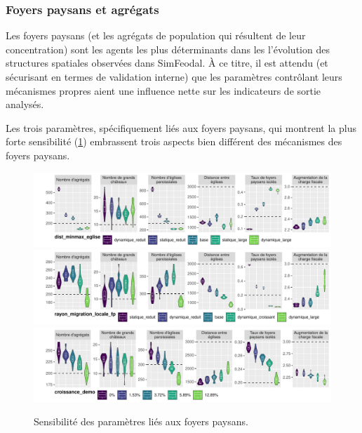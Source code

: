 \subsubsection{Foyers paysans et agrégats \label{subsubsec:sensib-fp}}

Les foyers paysans (et les agrégats de population qui résultent de leur concentration) sont les agents les plus déterminants dans les l'évolution des structures spatiales observées dans SimFeodal.
À ce titre, il est attendu (et sécurisant en termes de validation interne) que les paramètres contrôlant leurs mécanismes propres aient une influence nette sur les indicateurs de sortie analysés.

Les trois paramètres, spécifiquement liés aux foyers paysans, qui montrent la plus forte sensibilité (\cref{fig:sensib-fp}) embrassent trois aspects bien différent des mécanismes des foyers paysans.

\begin{figure}[H]
	\centering
	\includegraphics[width=\linewidth]{img/sensib/sensibilite_dist_minmax_eglise.pdf}
	\includegraphics[width=\linewidth]{img/sensib/sensibilite_rayon_migration_locale_fp.pdf}
	\includegraphics[width=\linewidth]{img/sensib/sensibilite_croissance_demo.pdf}
	\caption{Sensibilité des paramètres liés aux foyers paysans.}
	\label{fig:sensib-fp}
\end{figure}

